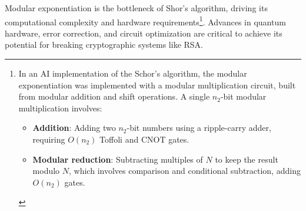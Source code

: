 \documentclass[conference,twoside]{IEEEtran}
\begin{document}
Modular exponentiation is the bottleneck of Shor's algorithm, driving its computational complexity and hardware requirements\footnote{In an AI implementation of the Schor's algorithm, the modular exponentiation was implemented with a modular multiplication circuit, built from modular addition and shift operations. A single \( n_2 \)-bit modular multiplication involves: \begin{itemize}
    \item \textbf{Addition}: Adding two \( n_2 \)-bit numbers using a ripple-carry adder, requiring \( O(n_2) \) Toffoli and CNOT gates.
    \item \textbf{Modular reduction}: Subtracting multiples of \( N \) to keep the result modulo \( N \), which involves comparison and conditional subtraction, adding \( O(n_2) \) gates.
\end{itemize} }. Advances in quantum hardware, error correction, and circuit optimization are critical to achieve its potential for breaking cryptographic systems like RSA.
\end{document}
